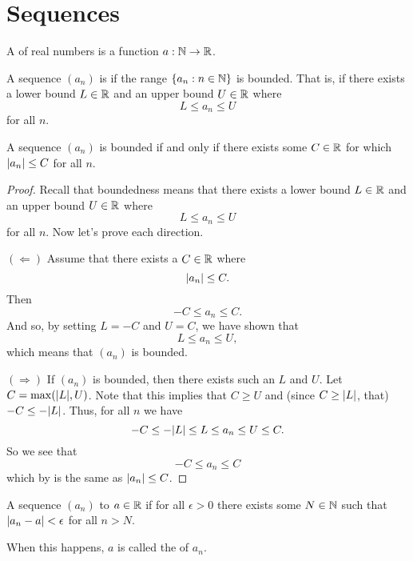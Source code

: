 \chapter{Sequences}
\begin{definition}[Sequences]
  A  of real numbers is a function $a : \mathbb N \to \mathbb R$.
\end{definition}

\begin{definition}
  A sequence $(a_n)$ is  if the range $\{ a_n : n
  \in \mathbb N \}$ is bounded. That is, if there exists a lower bound $L \in
  \mathbb R$ and an upper bound $U \in \mathbb R$ where
  \[ L \leq a_n \leq U \]
  for all $n$.
\end{definition}

\begin{proposition}
  A sequence $(a_n)$ is bounded if and only if there exists some $C
  \in \mathbb R$ for which $| a_n | \leq C$ for all $n$.
\end{proposition}

\begin{proof}
  Recall that boundedness means that there exists a lower bound $L
  \in \mathbb R$ and an upper bound $U \in \mathbb R$ where
  \[ L \leq a_n \leq U \]
  for all $n$. Now let's prove each direction.

  $(\Leftarrow)$ Assume that there exists a $C \in \mathbb R$ where
  \[ | a_n | \leq C. \]
  Then
  \[ -C \leq a_n \leq C. \]
  And so, by setting $L = -C$ and $U = C$, we have shown that
  \[ L \leq a_n \leq U, \]
  which means that $(a_n)$ is bounded.

  $(\Rightarrow)$ If $(a_n)$ is bounded, then there exists such an
  $L$ and $U$. Let $C = \max(| L |, U)$. Note that this implies
  that $C \geq U$ and (since $C \geq | L |$, that) $-C \leq
  -| L |$. Thus, for all $n$ we have
  \[ -C \leq -| L | \leq L \leq a_n \leq U \leq C. \]
  So we see that
  \[ -C \leq a_n \leq C \]
  which by  is the same as
  $| a_n | \leq C$.
\end{proof}

\begin{definition}
  A sequence $(a_n)$  to $a \in \mathbb R$ if for all
  $\epsilon > 0$ there exists some $N \in \mathbb N$ such that $| a_n -
  a | < \epsilon$ for all $n > N$.

  When this happens, $a$ is called the  of $a_n$.
\end{definition}

